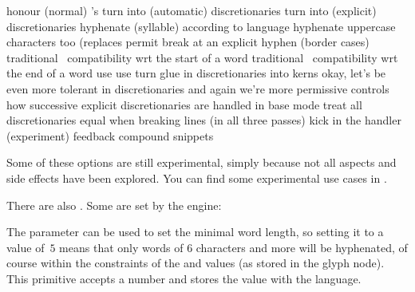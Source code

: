 \starttabulate[|rT|p|]
\NC \tohexadecimal \normalhyphenationcode            \NC honour (normal) \type{\discretionary}'s \NC \NR
\NC \tohexadecimal \automatichyphenationcode         \NC turn \type {-} into (automatic) discretionaries \NC \NR
\NC \tohexadecimal \explicithyphenationcode          \NC turn \type {\-} into (explicit) discretionaries \NC \NR
\NC \tohexadecimal \syllablehyphenationcode          \NC hyphenate (syllable) according to language \NC \NR
\NC \tohexadecimal \uppercasehyphenationcode         \NC hyphenate uppercase characters too (replaces \type {\uchyph} \NC \NR
\NC \tohexadecimal \compoundhyphenationcode          \NC permit break at an explicit hyphen (border cases) \NC \NR
\NC \tohexadecimal \strictstarthyphenationcode       \NC traditional \TEX\ compatibility wrt the start of a word \NC \NR
\NC \tohexadecimal \strictendhyphenationcode         \NC traditional \TEX\ compatibility wrt the end of a word \NC \NR
\NC \tohexadecimal \automaticpenaltyhyphenationcode  \NC use \type {\automatichyphenpenalty} \NC \NR
\NC \tohexadecimal \explicitpenaltyhyphenationcode   \NC use \type {\explicithyphenpenalty} \NC \NR
\NC \tohexadecimal \permitgluehyphenationcode        \NC turn glue in discretionaries into kerns \NC \NR
\NC \tohexadecimal \permitallhyphenationcode         \NC okay, let's be even more tolerant in discretionaries \NC \NR
\NC \tohexadecimal \permitmathreplacehyphenationcode \NC and again we're more permissive \NC \NR
\NC \tohexadecimal \lazyligatureshyphenationcode     \NC controls how successive explicit discretionaries are handled in base mode \NC \NR
\NC \tohexadecimal \forcecheckhyphenationcode        \NC treat all discretionaries equal when breaking lines (in all three passes) \NC \NR
\NC \tohexadecimal \forcehandlerhyphenationcode      \NC kick in the handler (experiment) \NC \NR
\NC \tohexadecimal \feedbackcompoundhyphenationcode  \NC feedback compound snippets \NC \NR
\stoptabulate

Some of these options are still experimental, simply because not all aspects and
side effects have been explored. You can find some experimental use cases in
\CONTEXT.

There are also \type {\discretionaryoptions}. Some are set by the engine:

\starttworows
{}
\stoptworows

\stopsection

\startsection[title={Controlling hyphenation}]

The \typ {\hyphenationmin} parameter can be used to set the minimal word length,
so setting it to a value of~$5$ means that only words of 6 characters and more
will be hyphenated, of course within the constraints of the \typ {\lefthyphenmin}
and \typ {\righthyphenmin} values (as stored in the glyph node). This primitive
accepts a number and stores the value with the language.

